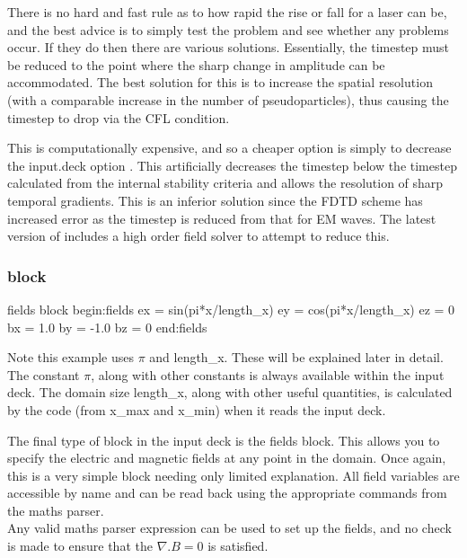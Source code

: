 There is no hard and fast rule as to how rapid the rise or fall for a laser can
be, and the best advice is to simply test the problem and see whether any
problems occur. If they do then there are various solutions. Essentially, the
timestep must be reduced to the point where the sharp change in amplitude can
be accommodated. The best solution for this is to increase the spatial
resolution (with a comparable increase in the number of pseudoparticles), thus
causing the timestep to drop via the CFL condition.

This is computationally expensive, and so a cheaper option is simply to
decrease the input.deck option . This artificially
decreases the timestep below the timestep calculated from the internal
stability criteria and allows the resolution of sharp temporal gradients. This
is an inferior solution since the FDTD scheme has increased error as the
timestep is reduced from that for EM waves. The latest version of {\EPOCH}
includes a high order field solver to attempt to reduce this.

\subsubsection{ block}
\begin{lboxverbatim}{fields block}
begin:fields
   ex = sin(pi*x/length_x)
   ey = cos(pi*x/length_x)
   ez = 0
   bx = 1.0
   by = -1.0
   bz = 0
end:fields
\end{lboxverbatim}

Note this example uses $\pi$ and length\_x. These will be explained later in
detail. The constant $\pi$, along with other constants is always available
within the input deck. The domain size length\_x, along with other useful
quantities, is calculated by the code (from x\_max and x\_min)
when it reads the input deck.

The final type of block in the {\EPOCH} input deck is the fields block. This
allows you to specify the electric and magnetic fields at any point in the
domain. Once again, this is a very simple block needing only limited
explanation. All field variables are accessible by name and can be read back
using the appropriate commands from the maths parser. \\

Any valid maths parser expression can be used to set up the fields, and no
check is made to ensure that the $\nabla.B = 0$ is satisfied. \\

